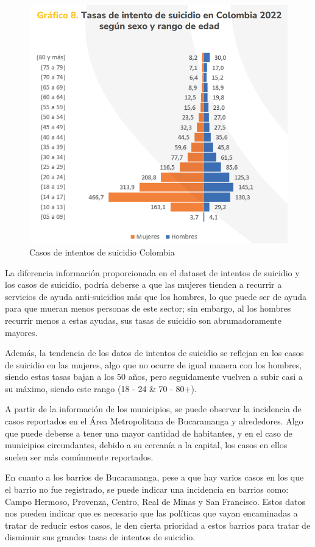 \documentclass[
]{article}
\begin{document}
\begin{figure}
\centering
\includegraphics{intentos.png}
\caption{Casos de intentos de suicidio Colombia}
\end{figure}

La diferencia información proporcionada en el dataset de intentos de
suicidio y los casos de suicidio, podría deberse a que las mujeres
tienden a recurrir a servicios de ayuda anti-suicidios más que los
hombres, lo que puede ser de ayuda para que mueran menos personas de
este sector; sin embargo, al los hombres recurrir menos a estas ayudas,
sus tasas de suicidio son abrumadoramente mayores.

Además, la tendencia de los datos de intentos de suicidio se reflejan en
los casos de suicidio en las mujeres, algo que no ocurre de igual manera
con los hombres, siendo estas tasas bajan a los 50 años, pero
seguidamente vuelven a subir casi a su máximo, siendo este rango (18 -
24 \& 70 - 80+).

A partir de la información de los municipios, se puede observar la
incidencia de casos reportados en el Área Metropolitana de Bucaramanga y
alrededores. Algo que puede deberse a tener una mayor cantidad de
habitantes, y en el caso de municipios circundantes, debido a su
cercanía a la capital, los casos en ellos suelen ser más comúnmente
reportados.

En cuanto a los barrios de Bucaramanga, pese a que hay varios casos en
los que el barrio no fue registrado, se puede indicar una incidencia en
barrios como: Campo Hermoso, Provenza, Centro, Real de Minas y San
Francisco. Estos datos nos pueden indicar que es necesario que las
políticas que vayan encaminadas a tratar de reducir estos casos, le den
cierta prioridad a estos barrios para tratar de disminuir sus grandes
tasas de intentos de suicidio.
\end{document}
